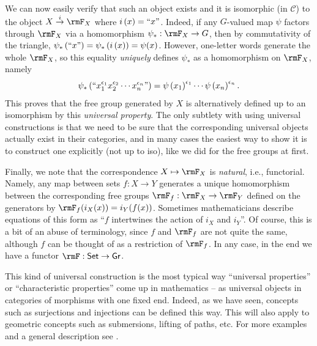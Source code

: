 \begin{example}
We can now easily verify that such an object exists and it is isomorphic
(in $\mathcal{C}$) to the object $X\overset{i}{\to}\rmF_{X}$ where
$i\left(x\right)=``x"$. Indeed, if any $G$-valued map $\psi$ factors
through $\rmF_{X}$ via a homomorphism $\psi_{\ast}:\rmF_{X}\to G$, then
by commutativity of the triangle, $\psi_{\ast}\left(``x"\right)=\psi_{\ast}\left(i\left(x\right)\right)=\psi(x)$.
However, one-letter words generate the whole $\rmF_{X}$, so this equality
\emph{uniquely} defines $\psi_{\ast}$ as a homomorphism on $\rmF_{X}$,
namely
\begin{equation}
\psi_{\ast}\left(``x_{1}^{\epsilon_{1}}x_{2}^{\epsilon_{2}}\cdots x_{n}^{\epsilon_{n}}"\right)=\psi\left(x_{1}\right)^{\epsilon_{1}}\cdots\psi\left(x_{n}\right)^{\epsilon_{n}}.
\end{equation}
This proves that the free group generated by $X$ is alternatively
defined up to an isomorphism by this \emph{universal property}.
The only subtlety with using universal constructions is that we need
to be sure that the corresponding universal objects actually exist
in their categories, and in many cases the easiest way to show it
is to construct one explicitly (not up to iso), like we did for the
free groups at first.

Finally, we note that the correspondence $X\mapsto \rmF_X$ is \emph{natural}, i.e., functorial. Namely, any map between sets $f:X\to Y$ generates a unique homomorphism between the corresponding free groups $\rmF_f:\rmF_X\to \rmF_Y$ defined on the generators by $\rmF_f (i_X(x))=i_Y(f(x))$. Sometimes mathematicians describe equations of this form as ``$f$ intertwines the action of $i_X$ and $i_Y$''. Of course, this is a bit of an abuse of terminology, since $f$ and $\rmF_f$ are not quite the same, although $f$ can be thought of as a restriction of $\rmF_f$. In any case, in the end we have a functor $\rmF:\mathsf{Set}\to\mathsf{Gr}$.
\end{example}

This kind of universal construction is the most typical way ``universal properties'' or ``characteristic properties'' come up in mathematics -- as universal objects in categories of morphisms with one fixed end. Indeed, as we have seen, concepts such as surjections and injections can be defined this way. This will also apply to geometric concepts such as submersions, lifting of paths, etc. For more examples and a general description see \cite[Exercise~7.8:24 and Def.~7.8:12]{Bergman}.

